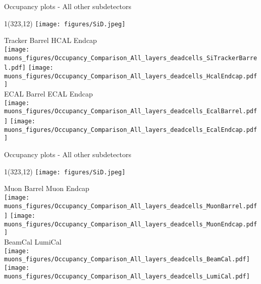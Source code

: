 \documentclass[xcolor={dvipsnames}]{beamer}
\newcommand{\sidlogo}{
  \setlength{\TPHorizModule}{1pt}
  \setlength{\TPVertModule}{1pt}
  \begin{textblock}{1}(323,12)
   \texttt{[image: figures/SiD.jpeg]}
  \end{textblock}
  }
\begin{document}
\begin{frame}{Occupancy plots - \small All other subdetectors}
\sidlogo
{\footnotesize Tracker Barrel \hspace*{5cm} HCAL Endcap}\\
\texttt{[image: muons\_figures/Occupancy\_Comparison\_All\_layers\_deadcells\_SiTrackerBarrel.pdf]}\hfill
\texttt{[image: muons\_figures/Occupancy\_Comparison\_All\_layers\_deadcells\_HcalEndcap.pdf]}\\
{\footnotesize ECAL Barrel \hspace*{5.2cm} ECAL Endcap}\\
\texttt{[image: muons\_figures/Occupancy\_Comparison\_All\_layers\_deadcells\_EcalBarrel.pdf]}\hfill
\texttt{[image: muons\_figures/Occupancy\_Comparison\_All\_layers\_deadcells\_EcalEndcap.pdf]}\\
\end{frame}
\begin{frame}{Occupancy plots - \small All other subdetectors}
\sidlogo
{\footnotesize Muon Barrel \hspace*{5.2cm} Muon Endcap}\\
\texttt{[image: muons\_figures/Occupancy\_Comparison\_All\_layers\_deadcells\_MuonBarrel.pdf]}\hfill
\texttt{[image: muons\_figures/Occupancy\_Comparison\_All\_layers\_deadcells\_MuonEndcap.pdf]}\\
{\footnotesize BeamCal \hspace*{5.8cm} LumiCal}\\
\texttt{[image: muons\_figures/Occupancy\_Comparison\_All\_layers\_deadcells\_BeamCal.pdf]}\hfill
\texttt{[image: muons\_figures/Occupancy\_Comparison\_All\_layers\_deadcells\_LumiCal.pdf]}\\
\end{frame}
\end{document}
